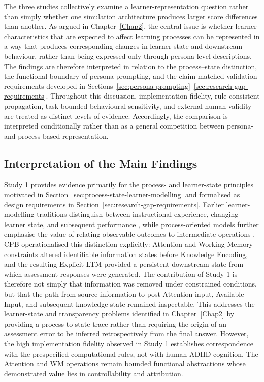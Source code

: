 The three studies collectively examine a learner-representation question rather than simply whether one simulation architecture produces larger score differences than another. As argued in Chapter~\ref{Chap2}, the central issue is whether learner characteristics that are expected to affect learning processes can be represented in a way that produces corresponding changes in learner state and downstream behaviour, rather than being expressed only through persona-level descriptions. The findings are therefore interpreted in relation to the process--state distinction, the functional boundary of persona prompting, and the claim-matched validation requirements developed in Sections~\ref{sec:persona-prompting}--\ref{sec:research-gap-requirements}. Throughout this discussion, implementation fidelity, rule-consistent propagation, task-bounded behavioural sensitivity, and external human validity are treated as distinct levels of evidence. Accordingly, the comparison is interpreted conditionally rather than as a general competition between persona- and process-based representation.

\subsection{Interpretation of the Main Findings}

Study 1 provides evidence primarily for the process- and learner-state principles motivated in Section~\ref{sec:process-state-learner-modelling} and formalised as design requirements in Section~\ref{sec:research-gap-requirements}. Earlier learner-modelling traditions distinguish between instructional experience, changing learner state, and subsequent performance \cite{corbett-anderson-1995-knowledge,abdelrahman-etal-2023-knowledge}, while process-oriented models further emphasise the value of relating observable outcomes to intermediate operations \cite{anderson-etal-1995-cognitive}. CPB operationalised this distinction explicitly: Attention and Working-Memory constraints altered identifiable information states before Knowledge Encoding, and the resulting Explicit LTM provided a persistent downstream state from which assessment responses were generated. The contribution of Study 1 is therefore not simply that information was removed under constrained conditions, but that the path from source information to post-Attention input, Available Input, and subsequent knowledge state remained inspectable. This addresses the learner-state and transparency problems identified in Chapter~\ref{Chap2} by providing a process-to-state trace rather than requiring the origin of an assessment error to be inferred retrospectively from the final answer. However, the high implementation fidelity observed in Study 1 establishes correspondence with the prespecified computational rules, not with human ADHD cognition. The Attention and WM operations remain bounded functional abstractions whose demonstrated value lies in controllability and attribution.

